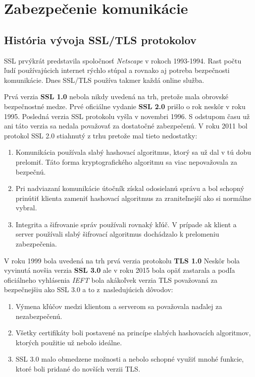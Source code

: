 \chapter[Zabezpečenie komunikácie]{Zabezpečenie komunikácie}

\section{História vývoja SSL/TLS protokolov}
SSL prvýkrát predstavila spoločnosť \emph{Netscape} v rokoch 1993-1994. Rast počtu ľudí používajúcich internet rýchlo stúpal a rovnako aj potreba bezpečnosti komunikácie. Dnes SSL/TLS používa takmer každá online služba. 

Prvá verzia \textbf{SSL 1.0} nebola nikdy uvedená na trh, pretože mala obrovské bezpečnostné medze. Prvé oficiálne vydanie \textbf{SSL 2.0} prišlo o rok neskôr v roku 1995. Posledná verzia SSL protokolu vyšla v novembri 1996. S odstupom času už ani táto verzia sa nedala považovať za dostatočné zabezpečenú. V roku 2011 bol protokol SSL 2.0 stiahnutý z trhu pretože mal tieto nedostatky:
\begin{enumerate}

\item Komunikácia používala slabý hashovací algoritmus, ktorý sa už dal v tú dobu prelomiť. Táto forma kryptografického algoritmu sa viac nepovažovala za bezpečnú.

\item Pri nadviazaní komunikácie útočník získal odosielanú správu a bol schopný prinútiť klienta zameniť hashovací algoritmus za zraniteľnejší ako si normálne vybral.

\item Integrita a šifrovanie správ používali rovnaký kľúč. V prípade ak klient a server používali slabý šifrovací algoritmus dochádzalo k prelomeniu zabezpečenia.

\end{enumerate}

V roku 1999 bola uvedená na trh prvá verzia protokolu \textbf{TLS 1.0}
Neskôr bola vyvinutá novšia verzia \textbf{SSL 3.0} ale v roku 2015 bola opäť zastarala a podľa oficiálneho vyhlásenia \emph{IEFT} bola akákoľvek verzia TLS považovaná za bezpečnejšiu ako SSL 3.0 a to z~nasledujúcich dôvodov:

\begin{enumerate}

\item Výmena kľúčov medzi klientom a serverom sa považovala naďalej za nezabezpečenú.

\item Všetky certifikáty boli postavené na princípe slabých hashovacích algoritmov, ktorých použitie už nebolo ideálne.

\item SSL 3.0 malo obmedzene možnosti a nebolo schopné využiť mnohé funkcie, ktoré boli pridané do novších verzii TLS.

\end{enumerate}

